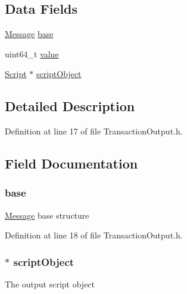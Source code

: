\subsection*{Data Fields}
\begin{DoxyCompactItemize}
\item 
\hyperlink{struct_message}{Message} \hyperlink{struct_transaction_output_a8987f797adf70c3e174fd64cc68bc933}{base}
\item 
uint64\_\-t \hyperlink{struct_transaction_output_a4e630859cc0e2a22bd6acf39a6a8e218}{value}
\item 
\hyperlink{struct_byte_array}{Script} $\ast$ \hyperlink{struct_transaction_output_ac420de2766b1358b5e325cfc21a76aa3}{scriptObject}
\end{DoxyCompactItemize}


\subsection{Detailed Description}


Definition at line 17 of file TransactionOutput.h.



\subsection{Field Documentation}
\hypertarget{struct_transaction_output_a8987f797adf70c3e174fd64cc68bc933}{
\subsubsection[{base}]{ {\bf base}}}
\label{struct_transaction_output_a8987f797adf70c3e174fd64cc68bc933}
\hyperlink{struct_message}{Message} base structure 

Definition at line 18 of file TransactionOutput.h.

\hypertarget{struct_transaction_output_ac420de2766b1358b5e325cfc21a76aa3}{
\subsubsection[{scriptObject}]{$\ast$ {\bf scriptObject}}}
\label{struct_transaction_output_ac420de2766b1358b5e325cfc21a76aa3}
The output script object 

